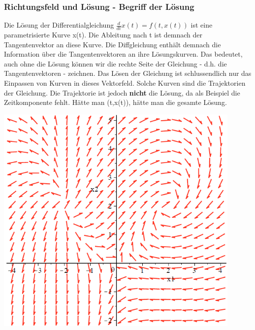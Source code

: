 \subsubsection{Richtungsfeld und Lösung - Begriff der Lösung}
Die Lösung der Differentialgleichung $\frac{d}{dt}x(t) = f(t,x(t))$ ist eine parametrisierte Kurve x(t). Die Ableitung nach t ist demnach der Tangentenvektor an diese Kurve. Die Diffgleichung enthält demnach die Information über die Tangentenvektoren an ihre Lösungskurven. 
Das bedeutet, auch ohne die Lösung können wir die rechte Seite der Gleichung - d.h. die Tangentenvektoren - zeichnen. Das Lösen der Gleichung ist schlussendlich nur das Einpassen von Kurven in dieses Vektorfeld. Solche Kurven sind die Trajektorien der Gleichung. Die Trajektorie ist jedoch \textbf{nicht} die Lösung, da als Beispiel die Zeitkomponente fehlt. Hätte man (t,x(t)), hätte man die gesamte Lösung. 
\begin{minipage}[h]{0.35\textwidth} 
	\includegraphics[width=0.9\textwidth]{images/Vektorfeld.png}
\end{minipage}
